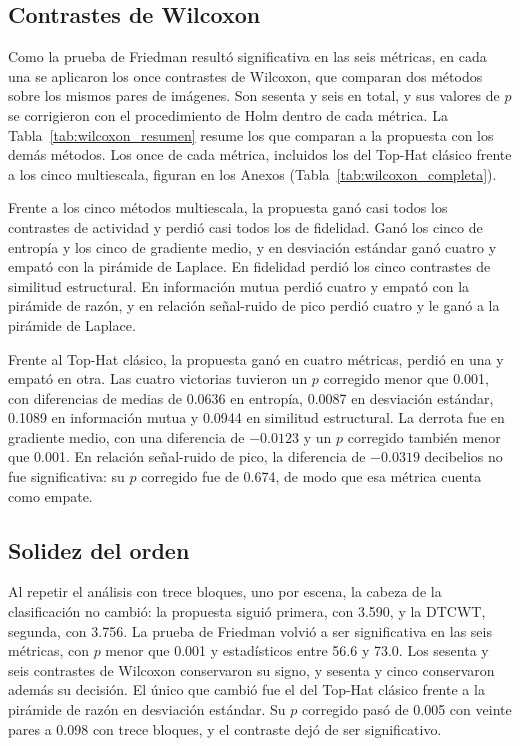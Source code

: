 \subsection{Contrastes de Wilcoxon}
\label{sec:res-wilcoxon}

Como la prueba de Friedman resultó significativa en las seis métricas, en cada una se aplicaron los
once contrastes de Wilcoxon, que comparan dos métodos sobre los mismos pares de imágenes. Son sesenta y
seis en total, y sus valores de $p$ se corrigieron con el procedimiento de Holm dentro de cada métrica. La
Tabla~\ref{tab:wilcoxon_resumen} resume los que comparan a la propuesta con los demás métodos. Los once
de cada métrica, incluidos los del Top-Hat clásico frente a los cinco multiescala, figuran en los Anexos
(Tabla~\ref{tab:wilcoxon_completa}).



Frente a los cinco métodos multiescala, la propuesta ganó casi todos los contrastes de actividad y
perdió casi todos los de fidelidad. Ganó los cinco de entropía y los cinco de gradiente medio, y en
desviación estándar ganó cuatro y empató con la pirámide de Laplace. En fidelidad perdió los cinco
contrastes de similitud estructural. En información mutua perdió cuatro y empató con la pirámide de
razón, y en relación señal-ruido de pico perdió cuatro y le ganó a la pirámide de Laplace.

Frente al Top-Hat clásico, la propuesta ganó en cuatro métricas, perdió en una y empató en otra. Las
cuatro victorias tuvieron un $p$ corregido menor que 0.001, con diferencias de medias de 0.0636 en
entropía, 0.0087 en desviación estándar, 0.1089 en información mutua y 0.0944 en similitud
estructural. La derrota fue en gradiente medio, con una diferencia de $-0.0123$ y un $p$ corregido también menor que 0.001. En relación señal-ruido de pico, la
diferencia de $-0.0319$ decibelios no fue significativa: su $p$ corregido fue de 0.674, de modo que esa
métrica cuenta como empate.

\subsection{Solidez del orden}
\label{sec:res-robustez}

Al repetir el análisis con trece bloques, uno por escena, la cabeza de la clasificación no cambió: la
propuesta siguió primera, con 3.590, y la DTCWT, segunda, con 3.756. La prueba de Friedman volvió a
ser significativa en las seis métricas, con $p$ menor que 0.001 y estadísticos entre 56.6 y 73.0. Los sesenta y seis contrastes de
Wilcoxon conservaron su signo, y sesenta y cinco conservaron además su decisión. El único que cambió fue
el del Top-Hat clásico frente a la pirámide de razón en desviación estándar. Su $p$ corregido pasó de
0.005 con veinte pares a 0.098 con trece bloques, y el contraste dejó de ser significativo.

